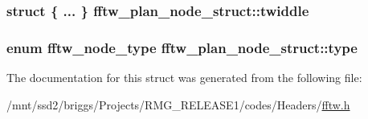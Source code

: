 \hypertarget{structfftw__plan__node__struct_a2ee21026cb07be7ecfe33bc417341988}{
\subsubsection[{twiddle}]{\setlength{\rightskip}{0pt plus 5cm}struct \{ ... \}   fftw\-\_\-plan\-\_\-node\-\_\-struct\-::twiddle}}\label{structfftw__plan__node__struct_a2ee21026cb07be7ecfe33bc417341988}
\hypertarget{structfftw__plan__node__struct_a726e9ec82efd03cdc7b8be71c0c7225f}{
\subsubsection[{type}]{\setlength{\rightskip}{0pt plus 5cm}enum {\bf fftw\-\_\-node\-\_\-type} fftw\-\_\-plan\-\_\-node\-\_\-struct\-::type}}\label{structfftw__plan__node__struct_a726e9ec82efd03cdc7b8be71c0c7225f}


The documentation for this struct was generated from the following file\-:\begin{DoxyCompactItemize}
\item 
/mnt/ssd2/briggs/\-Projects/\-R\-M\-G\-\_\-\-R\-E\-L\-E\-A\-S\-E1/codes/\-Headers/\hyperlink{fftw_8h}{fftw.\-h}\end{DoxyCompactItemize}
